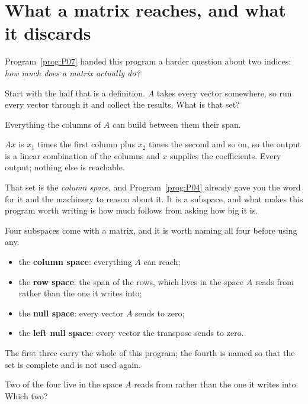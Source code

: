 \section{What a matrix reaches, and what it discards}
\label{sec:P08-subspaces}

\begin{fr}
Program~\ref{prog:P07} handed this program a harder question about two indices:
\emph{how much does a matrix actually do?}

Start with the half that is a definition. $A$ takes every vector somewhere, so
run every vector through it and collect the results. What is that set?
\dotline
\nextframe
\end{fr}

\begin{fr}
\begin{ansblock}
Everything the columns of $A$ can build between them \dash{} their span.
\end{ansblock}

$Ax$ is $x_1$ times the first column plus $x_2$ times the second and so on, so
the output is a linear combination of the columns and $x$ supplies the
coefficients. Every output; nothing else is reachable.

That set is the \emph{column space}, and Program~\ref{prog:P04} already gave
you the word for it and the machinery to reason about it. It is a subspace, and
what makes this program worth writing is how much follows from asking how big
it is.
\end{fr}

\begin{fr}
Four subspaces come with a matrix, and it is worth naming all four before using
any.

\begin{itemize}
\item the \textbf{column space}: everything $A$ can reach;
\item the \textbf{row space}: the span of the rows, which lives in the space
  $A$ reads from rather than the one it writes into;
\item the \textbf{null space}: every vector $A$ sends to zero;
\item the \textbf{left null space}: every vector the transpose sends to zero.
\end{itemize}

The first three carry the whole of this program; the fourth is named so that
the set is complete and is not used again.

Two of the four live in the space $A$ reads from rather than the one it writes
into. Which two?
\dotline
\nextframe
\end{fr}

